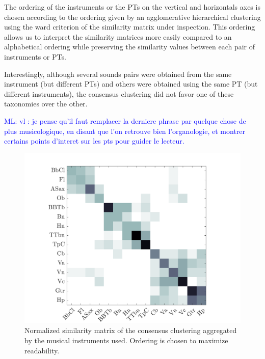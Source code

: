 \documentclass{bmcart}
\newcommand{\ml}[1]{\textcolor{blue}{ML: #1}}
\begin{document}
The ordering of the instruments or the PTs on the vertical and horizontals axes is chosen according to the ordering given by an agglomerative hierarchical clustering using the ward criterion of the similarity matrix under inspection. This ordering allows us to interpret the similarity matrices more easily compared to an alphabetical ordering while preserving the  similarity values between each pair of instruments or PTs.

Interestingly, although several sounds pairs were obtained from the same instrument (but different PTs) and others were obtained using the same PT (but different instruments), the consensus clustering did not favor one of these taxonomies over the other.

\ml{vl : je pense qu'il faut remplacer la derniere phrase par quelque chose de plus musicologique, en disant que l'on retrouve bien l'organologie, et montrer certains points d'interet sur les pts pour guider le lecteur.}

\begin{figure}
\center
\includegraphics[width = \textwidth]{figures/consensusVsI.png}
\caption{Normalized similarity matrix of the consensus clustering aggregated by the musical instruments used. Ordering is chosen to maximize readability.}
\label{fig:consensusVsI}
\end{figure}
\end{document}

